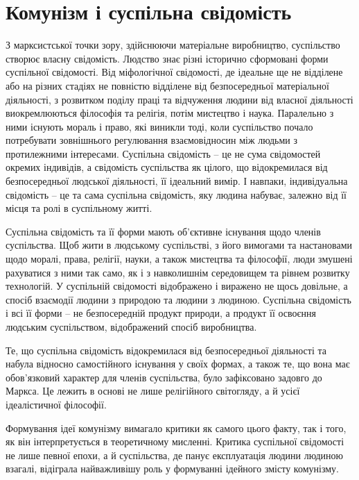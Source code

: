 \documentclass[../main]{subfiles}
\begin{document}
\ifSubfilesClassLoaded{\setcounter{page}{54}}{}
\section{Комунізм і суспільна свідомість}
\label{sec:10_kommunizm_soznanie}

З марксистської точки зору, здійснюючи матеріальне виробництво, суспільство створює власну свідомість. Людство знає різні історично сформовані форми суспільної свідомості. Від міфологічної свідомості, де ідеальне ще не відділене або на різних стадіях не повністю відділене від безпосередньої матеріальної діяльності, з розвитком поділу праці та відчуження людини від власної діяльності виокремлюються філософія та релігія, потім мистецтво і наука. Паралельно з ними існують мораль і право, які виникли тоді, коли суспільство почало потребувати зовнішнього регулювання взаємовідносин між людьми з протилежними інтересами. Суспільна свідомість – це не сума свідомостей окремих індивідів, а свідомість суспільства як цілого, що відокремилася від безпосередньої людської діяльності, її ідеальний вимір. І навпаки, індивідуальна свідомість – це та сама суспільна свідомість, яку людина набуває, залежно від її місця та ролі в суспільному житті.

Суспільна свідомість та її форми мають об’єктивне існування щодо членів суспільства. Щоб жити в людському суспільстві, з його вимогами та настановами щодо моралі, права, релігії, науки, а також мистецтва та філософії, люди змушені рахуватися з ними так само, як і з навколишнім середовищем та рівнем розвитку технологій. У суспільній свідомості відображено і виражено не щось довільне, а спосіб взаємодії людини з природою та людини з людиною. Суспільна свідомість і всі її форми – не безпосередній продукт природи, а продукт її освоєння людським суспільством, відображений спосіб виробництва.

Те, що суспільна свідомість відокремилася від безпосередньої діяльності та набула відносно самостійного існування у своїх формах, а також те, що вона має обов’язковий характер для членів суспільства, було зафіксовано задовго до Маркса. Це лежить в основі не лише релігійного світогляду, а й усієї ідеалістичної філософії.

Формування ідеї комунізму вимагало критики як самого цього факту, так і того, як він інтерпретується в теоретичному мисленні. Критика суспільної свідомості не лише певної епохи, а й суспільства, де панує експлуатація людини людиною взагалі, відіграла найважливішу роль у формуванні ідейного змісту комунізму.
\end{document}
